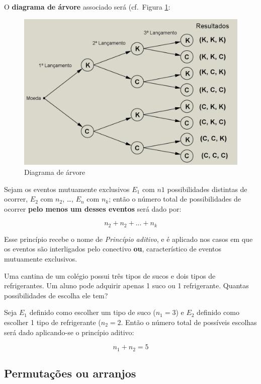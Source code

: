 \documentclass[
]{book}
\begin{document}
\hfill\break

O \textbf{diagrama de árvore} associado será (cf.~Figura \ref{fig:fig13}:

\hfill\break

\begin{figure}

{\centering \includegraphics[width=0.5\linewidth]{images4/diagrama_arvore_moeda} 

}

\caption{Diagrama de árvore}\label{fig:fig13}
\end{figure}

\hfill\break

Sejam os eventos mutuamente exclusivos \(E_{1}\) com \(n{1}\) possibilidades distintas de ocorrer, \(E_{2}\) com \(n_{2}\), \ldots, \(E_{n}\) com \(n_{k}\); então o número total de possibilidades de ocorrer \textbf{pelo menos um desses eventos} será dado por:

\[
n_{2} + n_{2} + ... + n_{k}
\]

\hfill\break

Esse princípio recebe o nome de \emph{Princípio aditivo}, e é aplicado nos casos em que os eventos são interligados pelo conectivo \textbf{ou}, característico de eventos mutuamente exclusivos.

\hfill\break

Uma cantina de um colégio possui três tipos de sucos e dois tipos de refrigerantes. Um aluno pode adquirir apenas 1 suco ou 1 refrigerante. Quantas possibilidades de escolha ele tem?

\hfill\break

Seja \(E_{1}\) definido como escolher um tipo de suco (\(n_{1}=3\)) e \(E_{2}\) definido como escolher 1 tipo de refrigerante (\(n_{2}=2\). Então o número total de possíveis escolhas será dado aplicando-se o princípio aditivo:

\hfill\break

\[
n_{1} + n_{2}=5
\]

\hfill\break

\hypertarget{permutauxe7uxf5es-ou-arranjos}{%
\subsection{Permutações ou arranjos}\label{permutauxe7uxf5es-ou-arranjos}}
\end{document}
